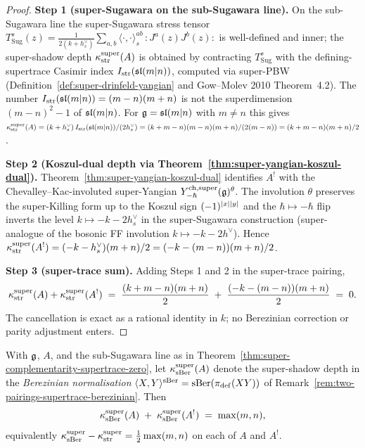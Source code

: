 \begin{proof}
\textbf{Step 1 (super-Sugawara on the sub-Sugawara line).} On the
sub-Sugawara line the super-Sugawara stress tensor
$T_{\mathrm{Sug}}^{s}(z) = \frac{1}{2(k+h^{\vee}_{s})}
\sum_{a,b}\langle\cdot,\cdot\rangle_{s}^{ab}\,
{:}J^{a}(z) J^{b}(z){:}$ is well-defined and inner; the super-shadow
depth $\kappa^{\mathrm{super}}_{\operatorname{str}}(A)$ is obtained by contracting
$T_{\mathrm{Sug}}^{s}$ with the defining-supertrace Casimir index
$I_{\operatorname{str}}(\mathfrak{sl}(m|n))$, computed via super-PBW
(Definition~\ref{def:super-drinfeld-yangian} and Gow--Molev
2010 Theorem~4.2). The number $I_{\operatorname{str}}(\mathfrak{sl}(m|n))=(m-n)(m+n)$ is not
the superdimension $(m-n)^2-1$ of $\mathfrak{sl}(m|n)$. For $\mathfrak{g} = \mathfrak{sl}(m|n)$
with $m\neq n$ this gives
$\kappa^{\mathrm{super}}_{\operatorname{str}}(A)
= (k+h^{\vee}_{s})\,I_{\operatorname{str}}(\mathfrak{sl}(m|n))/(2 h^{\vee}_{s})
= (k+m-n)(m-n)(m+n)/(2(m-n)) = (k+m-n)(m+n)/2$.

\textbf{Step 2 (Koszul-dual depth via Theorem~\ref{thm:super-yangian-koszul-dual}).}
Theorem~\ref{thm:super-yangian-koszul-dual} identifies $A^{!}$ with the
Chevalley--Kac-involuted super-Yangian
$Y^{\mathrm{ch},\mathrm{super}}_{-\hbar}(\mathfrak{g})^{\theta}$. The involution $\theta$ preserves the
super-Killing form up to the Koszul sign
$(-1)^{|x||y|}$ and the $\hbar\mapsto -\hbar$ flip
inverts the level $k\mapsto -k - 2h^{\vee}_{s}$ in the super-Sugawara
construction (super-analogue of the bosonic FF involution
$k\mapsto -k - 2h^{\vee}$). Hence
$\kappa^{\mathrm{super}}_{\operatorname{str}}(A^{!}) = (-k - h^{\vee}_{s})(m+n)/2
= (-k - (m-n))(m+n)/2$.

\textbf{Step 3 (super-trace sum).} Adding Steps 1 and 2 in the
super-trace pairing,
\[
 \kappa^{\mathrm{super}}_{\operatorname{str}}(A) +
 \kappa^{\mathrm{super}}_{\operatorname{str}}(A^{!})
 \;=\; \frac{(k+m-n)(m+n)}{2} \;+\; \frac{(-k-(m-n))(m+n)}{2}
 \;=\; 0.
\]
The cancellation is exact as a rational identity in $k$; no Berezinian
correction or parity adjustment enters.
\end{proof}

\begin{conjecture}
\label{conj:super-complementarity-berezinian-max-mn}
\ClaimStatusConjectured
With $\mathfrak{g}$, $A$, and the sub-Sugawara line as in
Theorem~\ref{thm:super-complementarity-supertrace-zero}, let
$\kappa^{\mathrm{super}}_{\operatorname{sBer}}(A)$ denote the super-shadow depth in
the \emph{Berezinian normalisation}
$\langle X,Y\rangle^{\operatorname{sBer}}=\operatorname{sBer}(\pi_{\mathrm{def}}(XY))$ of
Remark~\ref{rem:two-pairings-supertrace-berezinian}. Then
\begin{equation}
 \label{eq:super-complementarity-berezinian}
 \kappa^{\mathrm{super}}_{\operatorname{sBer}}(A) \;+\;
 \kappa^{\mathrm{super}}_{\operatorname{sBer}}(A^{!})
 \;=\;
 \max(m,n),
\end{equation}
equivalently $\kappa^{\mathrm{super}}_{\operatorname{sBer}} -
\kappa^{\mathrm{super}}_{\operatorname{str}} = \tfrac{1}{2}\max(m,n)$ on each of
$A$ and $A^{!}$.
\end{conjecture}

